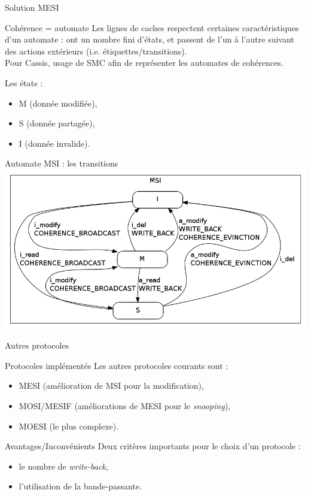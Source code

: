 \begin{frame}{Solution MESI}
  \begin{block}{Cohérence = automate}
    Les lignes de caches respectent certaines caractéristiques d'un automate : ont un nombre fini d'états, et passent de l'un à l'autre suivant des actions extérieurs (i.e. étiquettes/transitions).\\
    Pour \textsf{Cassis}, usage de \textsf{SMC} afin de représenter les automates de cohérences.
  \end{block}
  
  \begin{block}{Les états :}
    \begin{itemize}
    \item{M (donnée modifiée),}
    \item{S (donnée partagée),}
    \item{I (donnée invalide).}
    \end{itemize}
  \end{block}
\end{frame}

\begin{frame}{Automate MSI : les transitions}
    \includegraphics[scale=.4]{images/MSI_simple.png}
\end{frame}

\begin{frame}{Autres protocoles}
  \begin{block}{Protocoles implémentés}
    Les autres protocoles courants sont :
    \begin{itemize}
    \item{MESI (amélioration de MSI pour la modification),}
    \item{MOSI/MESIF (améliorations de MESI pour le \emph{snooping}),}
    \item{MOESI (le plus complexe).}
    \end{itemize}
  \end{block}
  
  \begin{block}{Avantages/Inconvénients}
    Deux critères importants pour le choix d'un protocole :
    \begin{itemize}
    \item{le nombre de \emph{write-back},}
    \item{l'utilisation de la bande-passante.}
    \end{itemize}
  \end{block}
\end{frame}

